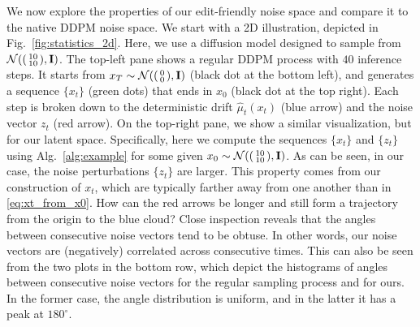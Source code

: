     We now explore the properties of our edit-friendly noise space and compare it to the native DDPM noise space. We start with a 2D illustration, depicted in Fig.~\ref{fig:statistics_2d}. Here, we use a diffusion model designed to sample from $\mathcal{N}( \begin{psmallmatrix}10\\10\end{psmallmatrix},\mathbf{I})$. The top-left pane shows a regular DDPM process with $40$ inference steps. It starts from $x_T \sim \mathcal{N}(\begin{psmallmatrix}0\\0\end{psmallmatrix},\mathbf{I})$ (black dot at the bottom left), and generates a sequence $\{x_t\}$ (green dots) that ends in $x_0$ (black dot at the top right). Each step is broken down to the deterministic drift $\hat\mu_t (x_t)$ (blue arrow) and the noise vector $z_t$ (red arrow). On the top-right pane, we show a similar visualization, but for our latent space. Specifically, here we compute the sequences $\{x_t\}$ and $\{z_t\}$ using Alg.~\ref{alg:example} for some given $x_0\sim \mathcal{N}(\begin{psmallmatrix}10\\10\end{psmallmatrix},\mathbf{I})$. As can be seen, in our case, the noise perturbations $\{z_t\}$ are larger. This property comes from our construction of $x_t$, which are typically farther away from one another than in \eqref{eq:xt_from_x0}. How can the red arrows be longer and still form a trajectory from the origin to the blue cloud? Close inspection reveals that the angles between consecutive noise vectors tend to be obtuse. In other words, our noise vectors are (negatively) correlated across consecutive times. This can also be seen from the two plots in the bottom row, which depict the histograms of angles between consecutive noise vectors for the regular sampling process and for ours. In the former case, the angle distribution is uniform, and in the latter it has a peak at $180^\circ$. 

